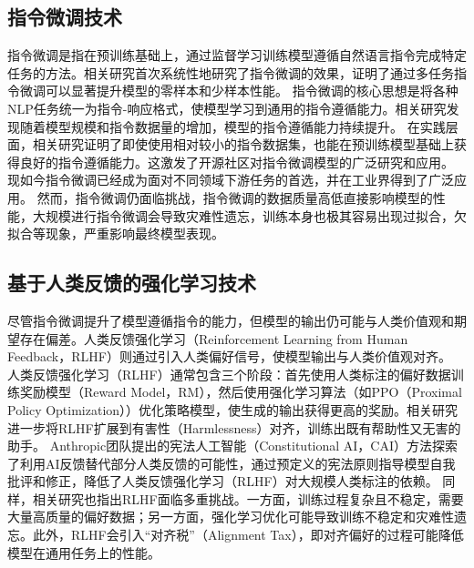 \subsection{指令微调技术}
指令微调是指在预训练基础上，通过监督学习训练模型遵循自然语言指令完成特定任务的方法\supercite{DBLP:conf/iclr/WeiBZGYLDDL22}。相关研究首次系统性地研究了指令微调的效果，证明了通过多任务指令微调可以显著提升模型的零样本和少样本性能。
指令微调的核心思想是将各种NLP任务统一为指令-响应格式，使模型学习到通用的指令遵循能力。相关研究发现随着模型规模和指令数据量的增加，模型的指令遵循能力持续提升\supercite{DBLP:journals/corr/abs-2210-11416}。
在实践层面，相关研究证明了即使使用相对较小的指令数据集，也能在预训练模型基础上获得良好的指令遵循能力\supercite{DBLP:journals/corr/abs-2305-15011}。这激发了开源社区对指令微调模型的广泛研究和应用。
现如今指令微调已经成为面对不同领域下游任务的首选，并在工业界得到了广泛应用。
然而，指令微调仍面临挑战，指令微调的数据质量高低直接影响模型的性能，大规模进行指令微调会导致灾难性遗忘，训练本身也极其容易出现过拟合，欠拟合等现象，严重影响最终模型表现。

\subsection{基于人类反馈的强化学习技术}
尽管指令微调提升了模型遵循指令的能力，但模型的输出仍可能与人类价值观和期望存在偏差。人类反馈强化学习（Reinforcement Learning from Human Feedback，RLHF）则通过引入人类偏好信号，使模型输出与人类价值观对齐。
人类反馈强化学习（RLHF）通常包含三个阶段：首先使用人类标注的偏好数据训练奖励模型（Reward Model，RM），然后使用强化学习算法（如PPO（Proximal Policy Optimization））优化策略模型，使生成的输出获得更高的奖励\supercite{DBLP:conf/nips/Ouyang0JAWMZASR22}。相关研究进一步将RLHF扩展到有害性（Harmlessness）对齐，训练出既有帮助性又无害的助手\supercite{DBLP:journals/corr/abs-2204-05862}。
Anthropic团队提出的宪法人工智能（Constitutional AI，CAI）方法探索了利用AI反馈替代部分人类反馈的可能性，通过预定义的宪法原则指导模型自我批评和修正，降低了人类反馈强化学习（RLHF）对大规模人类标注的依赖\supercite{DBLP:journals/corr/abs-2212-08073}。
同样，相关研究也指出RLHF面临多重挑战。一方面，训练过程复杂且不稳定，需要大量高质量的偏好数据；另一方面，强化学习优化可能导致训练不稳定和灾难性遗忘。此外，RLHF会引入“对齐税”（Alignment Tax），即对齐偏好的过程可能降低模型在通用任务上的性能。

